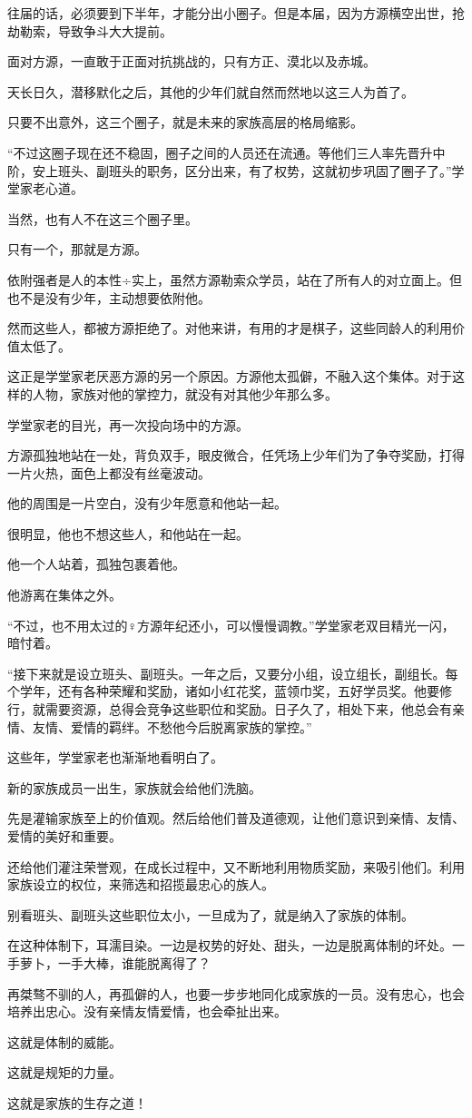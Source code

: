 \begin{this_body}
往届的话，必须要到下半年，才能分出小圈子。但是本届，因为方源横空出世，抢劫勒索，导致争斗大大提前。

面对方源，一直敢于正面对抗挑战的，只有方正、漠北以及赤城。

天长日久，潜移默化之后，其他的少年们就自然而然地以这三人为首了。

只要不出意外，这三个圈子，就是未来的家族高层的格局缩影。

“不过这圈子现在还不稳固，圈子之间的人员还在流通。等他们三人率先晋升中阶，安上班头、副班头的职务，区分出来，有了权势，这就初步巩固了圈子了。”学堂家老心道。

当然，也有人不在这三个圈子里。

只有一个，那就是方源。

依附强者是人的本性÷实上，虽然方源勒索众学员，站在了所有人的对立面上。但也不是没有少年，主动想要依附他。

然而这些人，都被方源拒绝了。对他来讲，有用的才是棋子，这些同龄人的利用价值太低了。

这正是学堂家老厌恶方源的另一个原因。方源他太孤僻，不融入这个集体。对于这样的人物，家族对他的掌控力，就没有对其他少年那么多。

学堂家老的目光，再一次投向场中的方源。

方源孤独地站在一处，背负双手，眼皮微合，任凭场上少年们为了争夺奖励，打得一片火热，面色上都没有丝毫波动。

他的周围是一片空白，没有少年愿意和他站一起。

很明显，他也不想这些人，和他站在一起。

他一个人站着，孤独包裹着他。

他游离在集体之外。

“不过，也不用太过的♀方源年纪还小，可以慢慢调教。”学堂家老双目精光一闪，暗忖着。

“接下来就是设立班头、副班头。一年之后，又要分小组，设立组长，副组长。每个学年，还有各种荣耀和奖励，诸如小红花奖，蓝领巾奖，五好学员奖。他要修行，就需要资源，总得会竞争这些职位和奖励。日子久了，相处下来，他总会有亲情、友情、爱情的羁绊。不愁他今后脱离家族的掌控。”

这些年，学堂家老也渐渐地看明白了。

新的家族成员一出生，家族就会给他们洗脑。

先是灌输家族至上的价值观。然后给他们普及道德观，让他们意识到亲情、友情、爱情的美好和重要。

还给他们灌注荣誉观，在成长过程中，又不断地利用物质奖励，来吸引他们。利用家族设立的权位，来筛选和招揽最忠心的族人。

别看班头、副班头这些职位太小，一旦成为了，就是纳入了家族的体制。

在这种体制下，耳濡目染。一边是权势的好处、甜头，一边是脱离体制的坏处。一手萝卜，一手大棒，谁能脱离得了？

再桀骜不驯的人，再孤僻的人，也要一步步地同化成家族的一员。没有忠心，也会培养出忠心。没有亲情友情爱情，也会牵扯出来。

这就是体制的威能。

这就是规矩的力量。

这就是家族的生存之道！

\end{this_body}

